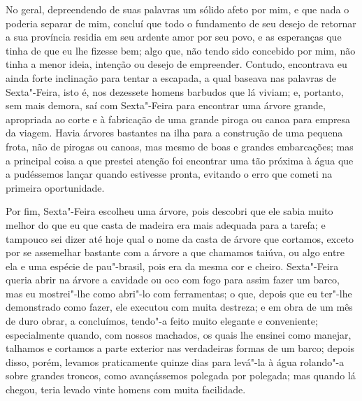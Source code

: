 No geral, depreendendo de suas palavras um sólido afeto por mim, e que
nada o poderia separar de mim, concluí que todo o fundamento de seu
desejo de retornar a sua província residia em seu ardente amor por seu
povo, e as esperanças que tinha de que eu lhe fizesse bem; algo que, não
tendo sido concebido por mim, não tinha a menor ideia, intenção ou
desejo de empreender. Contudo, encontrava eu ainda forte inclinação para
tentar a escapada, a qual baseava nas palavras de Sexta"-Feira, isto é,
nos dezessete homens barbudos que lá viviam; e, portanto, sem mais
demora, saí com Sexta"-Feira para encontrar uma árvore grande, apropriada
ao corte e à fabricação de uma grande piroga ou canoa para empresa da
viagem. Havia árvores bastantes na ilha para a construção de uma pequena
frota, não de pirogas ou canoas, mas mesmo de boas e grandes
embarcações; mas a principal coisa a que prestei atenção foi encontrar
uma tão próxima à água que a pudéssemos lançar quando estivesse pronta,
evitando o erro que cometi na primeira oportunidade.

Por fim, Sexta"-Feira escolheu uma árvore, pois descobri que ele sabia
muito melhor do que eu que casta de madeira era mais adequada para a
tarefa; e tampouco sei dizer até hoje qual o nome da casta de árvore que
cortamos, exceto por se assemelhar bastante com a árvore a que chamamos
taiúva, ou algo entre ela e uma espécie de pau"-brasil, pois era da mesma
cor e cheiro. Sexta"-Feira queria abrir na árvore a cavidade ou oco com
fogo para assim fazer um barco, mas eu mostrei"-lhe como abri"-lo com
ferramentas; o que, depois que eu ter"-lhe demonstrado como fazer, ele
executou com muita destreza; e em obra de um mês de duro obrar, a
concluímos, tendo"-a feito muito elegante e conveniente; especialmente
quando, com nossos machados, os quais lhe ensinei como manejar, talhamos
e cortamos a parte exterior nas verdadeiras formas de um barco; depois
disso, porém, levamos praticamente quinze dias para levá"-la à água
rolando"-a sobre grandes troncos, como avançássemos polegada por
polegada; mas quando lá chegou, teria levado vinte homens com muita
facilidade.

